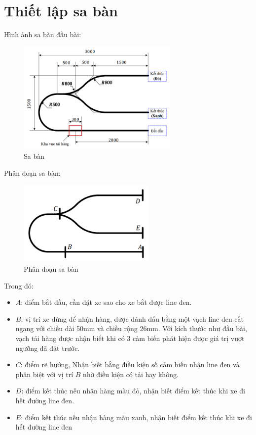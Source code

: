      \section{Thiết lập sa bàn}
          \hspace*{0.6cm}Hình ảnh sa bàn đầu bài:
          \begin{figure}[H]
               \centering
               \includegraphics[width=0.7\textwidth]{pictures/chapter7/saban.png}
               \caption{Sa bàn}
               \label{race}
          \end{figure}
          Phân đoạn sa bàn:
          \begin{figure}[H]
               \centering
               \includegraphics[width=0.6\textwidth]{pictures/chapter7/cut_saban.png}
               \caption{Phân đoạn sa bàn}
               \label{cut_race}
          \end{figure}
          Trong đó:
          \begin{itemize}
               \item $A$: điểm bắt đầu, cần đặt xe sao cho xe bắt được line đen.
               \item $B$: vị trí xe dừng để nhận hàng, được đánh dấu bằng một vạch line đen cắt
               ngang với chiều dài 50mm và chiều rộng 26mm. Với kích thước như đầu bài, vạch tải
               hàng được nhận biết khi có 3 cảm biến phát hiện được giá trị vượt ngưỡng đã đặt trước.
               \item $C$: điểm rẽ hướng, Nhận biết bằng điều kiện số cảm biến nhận line đen và phân biệt với vị trí $B$ nhờ điều kiện có tải hay không.
               \item $D$: điểm kết thúc nếu nhận hàng màu đỏ, nhận biết điểm kết thúc khi xe đi hết đường line đen.
               \item $E$: điểm kết thúc nếu nhận hàng màu xanh, nhận biết điểm kết thúc khi xe đi hết đường line đen
          \end{itemize}
